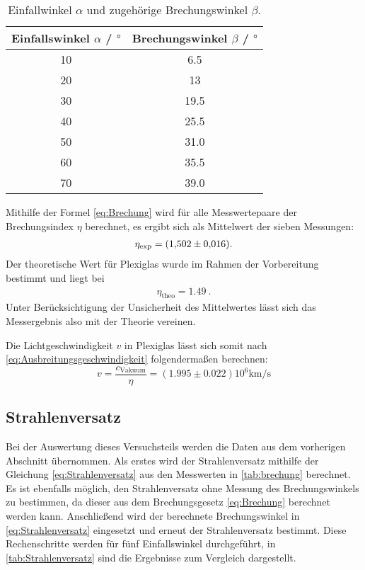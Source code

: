 \begin{table} [H]
    \centering
    \caption{Einfallwinkel $\alpha$ und zugehörige Brechungswinkel $\beta$.}
    \label{tab:brechung}
    \begin{tabular}{S S}
      \toprule
      {Einfallswinkel $\alpha$ / $\unit{\degree}$} & {Brechungswinkel $\beta$ / $\unit{\degree}$} \\
       & 6.5  \\
      20 & 13   \\
      30 & 19.5 \\
      40 & 25.5 \\
      50 & 31.0 \\
      60 & 35.5 \\
      70 & 39.0 \\
      \bottomrule
    \end{tabular}
\end{table}

Mithilfe der Formel \eqref{eq:Brechung} wird für alle Messwertepaare der Brechungsindex $\eta$ berechnet,
es ergibt sich als Mittelwert der sieben Messungen:
\begin{gather*}
    \eta_{\text{exp}}=\qty{1.502+-0.016}{}.
\end{gather*}
Der theoretische Wert für Plexiglas wurde im Rahmen der Vorbereitung bestimmt und liegt bei
\begin{gather*}
    \eta_{\text{theo}}=\qty{1.49}{}.
\end{gather*}
Unter Berücksichtigung der Unsicherheit des Mittelwertes lässt sich das Messergebnis also mit der Theorie vereinen.

Die Lichtgeschwindigkeit $v$ in Plexiglas lässt sich somit nach \eqref{eq:Ausbreitungsgeschwindigkeit} folgendermaßen berechnen:
\begin{equation*}
    v=\frac{c_{\text{Vakuum}}}{\eta}=(1.995\pm0.022)10^6\unit{\kilo\meter\per\second}
\end{equation*}

\subsection{Strahlenversatz}

Bei der Auswertung dieses Versuchsteils werden die Daten aus dem vorherigen Abschnitt übernommen.
Als erstes wird der Strahlenversatz mithilfe der Gleichung \eqref{eq:Strahlenversatz} aus den 
Messwerten in \autoref{tab:brechung} berechnet.
Es ist ebenfalls möglich, den Strahlenversatz ohne Messung des Brechungswinkels zu bestimmen, da dieser
aus dem Brechungsgesetz \eqref{eq:Brechung} berechnet werden kann.
Anschließend wird der berechnete Brechungswinkel in \eqref{eq:Strahlenversatz} eingesetzt und erneut
der Strahlenversatz bestimmt.
Diese Rechenschritte werden für fünf Einfallswinkel durchgeführt, in \autoref{tab:Strahlenversatz}
sind die Ergebnisse zum Vergleich dargestellt.

